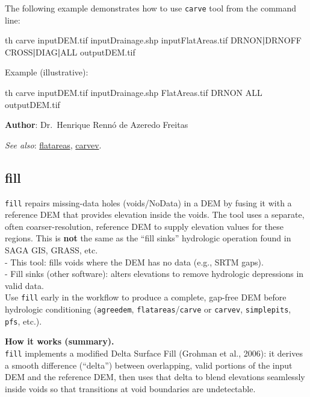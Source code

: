 \documentclass[
]{book}
\newenvironment{Shaded}{\begin{snugshade}}{\end{snugshade}}
\newcommand{\ExtensionTok}[1]{#1}
\newcommand{\KeywordTok}[1]{\textcolor[rgb]{0.13,0.29,0.53}{\textbf{#1}}}
\newcommand{\NormalTok}[1]{#1}
\begin{document}
The following example demonstrates how to use \texttt{carve} tool from the command line:

\begin{Shaded}
\begin{Highlighting}[]
\ExtensionTok{th}\NormalTok{ carve inputDEM.tif inputDrainage.shp inputFlatAreas.tif DRNON}\KeywordTok{|}\ExtensionTok{DRNOFF}\NormalTok{ CROSS}\KeywordTok{|}\ExtensionTok{DIAG}\KeywordTok{|}\ExtensionTok{ALL}\NormalTok{ outputDEM.tif}
\end{Highlighting}
\end{Shaded}

Example (illustrative):

\begin{Shaded}
\begin{Highlighting}[]
\ExtensionTok{th}\NormalTok{ carve inputDEM.tif inputDrainage.shp FlatAreas.tif DRNON ALL outputDEM.tif}
\end{Highlighting}
\end{Shaded}

\textbf{Author}: Dr.~Henrique Rennó de Azeredo Freitas

\emph{See also}: \hyperref[flatareas]{flatareas}, \hyperref[carvev]{carvev}.

\subsection{fill}\label{fill}

\texttt{fill} repairs missing-data holes (voids/NoData) in a DEM by fusing it with a reference DEM that provides elevation inside the voids. The tool uses a separate, often coarser-resolution, reference DEM to supply elevation values for these regions. This is \textbf{not} the same as the ``fill sinks'' hydrologic operation found in SAGA GIS, GRASS, etc.\\
- This tool: fills voids where the DEM has no data (e.g., SRTM gaps).\\
- Fill sinks (other software): alters elevations to remove hydrologic depressions in valid data.\\
Use \texttt{fill} early in the workflow to produce a complete, gap-free DEM before hydrologic conditioning (\texttt{agreedem}, \texttt{flatareas}/\texttt{carve} or \texttt{carvev}, \texttt{simplepits}, \texttt{pfs}, etc.).

\textbf{How it works (summary).}\\
\texttt{fill} implements a modified Delta Surface Fill (Grohman et al., 2006): it derives a smooth difference (``delta'') between overlapping, valid portions of the input DEM and the reference DEM, then uses that delta to blend elevations seamlessly inside voids so that transitions at void boundaries are undetectable.
\end{document}
